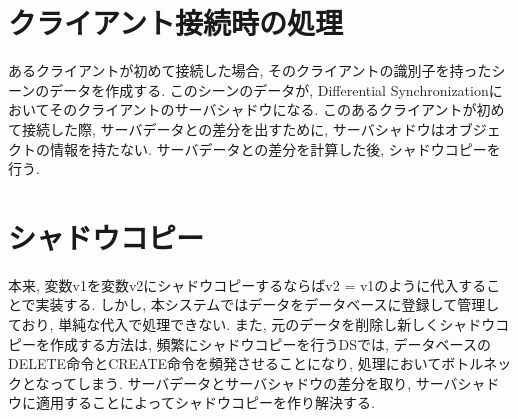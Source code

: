 \section{クライアント接続時の処理}
あるクライアントが初めて接続した場合, そのクライアントの識別子を持ったシーンのデータを作成する. このシーンのデータが, Differential Synchronizationにおいてそのクライアントのサーバシャドウになる. このあるクライアントが初めて接続した際, サーバデータとの差分を出すために, サーバシャドウはオブジェクトの情報を持たない. サーバデータとの差分を計算した後, シャドウコピーを行う.
\section{シャドウコピー}
本来, 変数v1を変数v2にシャドウコピーするならばv2 = v1のように代入することで実装する. しかし, 本システムではデータをデータベースに登録して管理しており, 単純な代入で処理できない.
また, 元のデータを削除し新しくシャドウコピーを作成する方法は, 頻繁にシャドウコピーを行うDSでは,
データベースのDELETE命令とCREATE命令を頻発させることになり, 処理においてボトルネックとなってしまう. サーバデータとサーバシャドウの差分を取り, サーバシャドウに適用することによってシャドウコピーを作り解決する.
